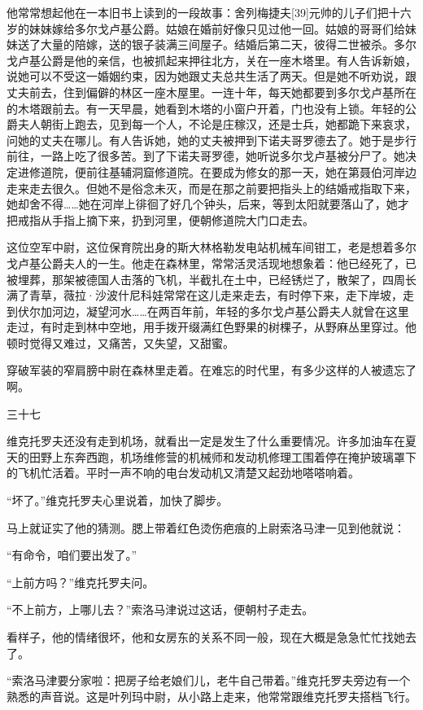他常常想起他在一本旧书上读到的一段故事：舍列梅捷夫[39]元帅的儿子们把十六岁的妹妹嫁给多尔戈卢基公爵。姑娘在婚前好像只见过他一回。姑娘的哥哥们给妹妹送了大量的陪嫁，送的银子装满三间屋子。结婚后第二天，彼得二世被杀。多尔戈卢基公爵是他的亲信，也被抓起来押往北方，关在一座木塔里。有人告诉新娘，说她可以不受这一婚姻约束，因为她跟丈夫总共生活了两天。但是她不听劝说，跟丈夫前去，住到偏僻的林区一座木屋里。一连十年，每天她都要到多尔戈卢基所在的木塔跟前去。有一天早晨，她看到木塔的小窗户开着，门也没有上锁。年轻的公爵夫人朝街上跑去，见到每一个人，不论是庄稼汉，还是士兵，她都跪下来哀求，问她的丈夫在哪儿。有人告诉她，她的丈夫被押到下诺夫哥罗德去了。她于是步行前往，一路上吃了很多苦。到了下诺夫哥罗德，她听说多尔戈卢基被分尸了。她决定进修道院，便前往基辅洞窟修道院。在要成为修女的那一天，她在第聂伯河岸边走来走去很久。但她不是俗念未灭，而是在那之前要把指头上的结婚戒指取下来，她却舍不得……她在河岸上徘徊了好几个钟头，后来，等到太阳就要落山了，她才把戒指从手指上摘下来，扔到河里，便朝修道院大门口走去。

这位空军中尉，这位保育院出身的斯大林格勒发电站机械车间钳工，老是想着多尔戈卢基公爵夫人的一生。他走在森林里，常常活灵活现地想象着：他已经死了，已被埋葬，那架被德国人击落的飞机，半截扎在土中，已经锈烂了，散架了，四周长满了青草，薇拉·沙波什尼科娃常常在这儿走来走去，有时停下来，走下岸坡，走到伏尔加河边，凝望河水……在两百年前，年轻的多尔戈卢基公爵夫人就曾在这里走过，有时走到林中空地，用手拨开缀满红色野果的树棵子，从野麻丛里穿过。他顿时觉得又难过，又痛苦，又失望，又甜蜜。

穿破军装的窄肩膀中尉在森林里走着。在难忘的时代里，有多少这样的人被遗忘了啊。

三十七

维克托罗夫还没有走到机场，就看出一定是发生了什么重要情况。许多加油车在夏天的田野上东奔西跑，机场维修营的机械师和发动机修理工围着停在掩护玻璃罩下的飞机忙活着。平时一声不响的电台发动机又清楚又起劲地嗒嗒响着。

“坏了。”维克托罗夫心里说着，加快了脚步。

马上就证实了他的猜测。腮上带着红色烫伤疤痕的上尉索洛马津一见到他就说：

“有命令，咱们要出发了。”

“上前方吗？”维克托罗夫问。

“不上前方，上哪儿去？”索洛马津说过这话，便朝村子走去。

看样子，他的情绪很坏，他和女房东的关系不同一般，现在大概是急急忙忙找她去了。

“索洛马津要分家啦：把房子给老娘们儿，老牛自己带着。”维克托罗夫旁边有一个熟悉的声音说。这是叶列玛中尉，从小路上走来，他常常跟维克托罗夫搭档飞行。


